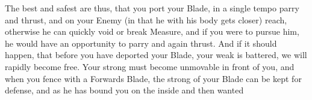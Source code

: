 The best and safest are thus, that you port your Blade, in a single
tempo parry and thrust, and on your Enemy (in that he with his body
gets closer) reach, otherwise he can quickly void or break Measure,
and if you were to pursue him, he would have an opportunity to parry
and again thrust. And if it should happen, that before you have
deported your Blade, your weak is battered, we will rapidly become
free. Your strong must become unmovable in front of you, and when you
fence with a Forwards Blade, the strong of your Blade can be kept for
defense, and as he has bound you on the inside and then wanted
